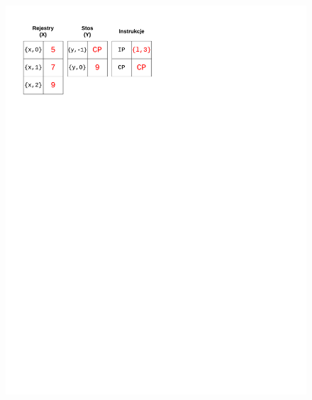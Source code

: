 \begin{figure}
\begin{multicols}{2}
\vspace{-4mm}
\begin{Figure}
 \centering
 \includegraphics[scale=0.65, clip, trim=0 215mm 110mm 0]{interpreter_max_3}
\label{fig:max3}
\end{Figure}


\end{multicols}
\end{figure}
